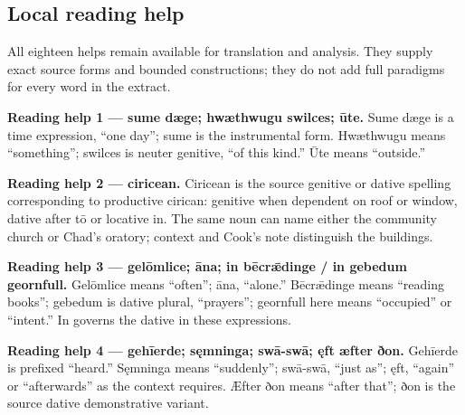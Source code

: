\subsection*{Local reading help}

All eighteen helps remain available for translation and analysis. They supply exact source forms and bounded constructions; they do not add full paradigms for every word in the extract.

\textbf{Reading help 1 — sume dæge; hwæthwugu swilces; ūte.} Sume dæge is a time expression, “one day”; sume is the instrumental form. Hwæthwugu means “something”; swilces is neuter genitive, “of this kind.” Ūte means “outside.”

\textbf{Reading help 2 — ciricean.} Ciricean is the source genitive or dative spelling corresponding to productive cirican: genitive when dependent on roof or window, dative after tō or locative in. The same noun can name either the community church or Chad’s oratory; context and Cook’s note distinguish the buildings.

\textbf{Reading help 3 — gelōmlice; āna; in bēcrǣdinge /\allowbreak{} in gebedum geornfull.} Gelōmlice means “often”; āna, “alone.” Bēcrǣdinge means “reading books”; gebedum is dative plural, “prayers”; geornfull here means “occupied” or “intent.” In governs the dative in these expressions.

\textbf{Reading help 4 — gehīerde; sęmninga; swā-swā; ęft æfter ðon.} Gehīerde is prefixed “heard.” Sęmninga means “suddenly”; swā-swā, “just as”; ęft, “again” or “afterwards” as the context requires. Æfter ðon means “after that”; ðon is the source dative demonstrative variant.

